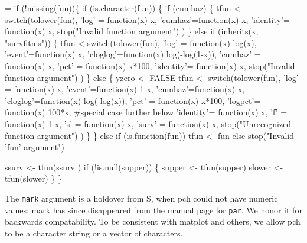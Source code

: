 \documentclass{article}
\newcommand{\code}[1]{\texttt{#1}}
\begin{document}
\begin{nwchunk}
=
 if (!missing(fun))\{
     if (is.character(fun)) \{
         if (cumhaz) \{
             tfun <- switch(tolower(fun),
                            'log' = function(x) x,
                            'cumhaz'=function(x) x,
                            'identity'= function(x) x,
                            stop("Invalid function argument")
                            )
         \} else if (inherits(x, "survfitms")) \{
             tfun <-switch(tolower(fun),
                           'log' = function(x) log(x),
                           'event'=function(x) x,
                           'cloglog'=function(x) log(-log(1-x)),
                           'cumhaz' = function(x) x,
                           'pct' = function(x) x*100,
                           'identity'= function(x) x,
                           stop("Invalid function argument")
                           )
         \} else \{
             yzero <- FALSE
             tfun <- switch(tolower(fun),
                        'log' = function(x) x,
                        'event'=function(x) 1-x,
                        'cumhaz'=function(x) x,
                        'cloglog'=function(x) log(-log(x)),
                        'pct' = function(x) x*100,
                        'logpct'= function(x) 100*x,  #special case further below
                        'identity'= function(x) x,
                        'f' = function(x) 1-x,
                        's' = function(x) x,
                        'surv' = function(x) x,
                        stop("Unrecognized function argument")
                        )
         \}
     \}
     else if (is.function(fun)) tfun <- fun
     else stop("Invalid 'fun' argument")
     
     ssurv <- tfun(ssurv )
     if (!is.null(supper)) \{
         supper <- tfun(supper)
         slower <- tfun(slower)
     \}
 \}
\end{nwchunk}
 
The \code{mark} argument is a holdover from S, when pch could not have
numeric values; mark has since disappeared from the manual page for
\code{par}.  We honor it for backwards compatability.
To be consistent with matplot and others, we allow pch to be a character
string or a vector of characters.
\end{document}
